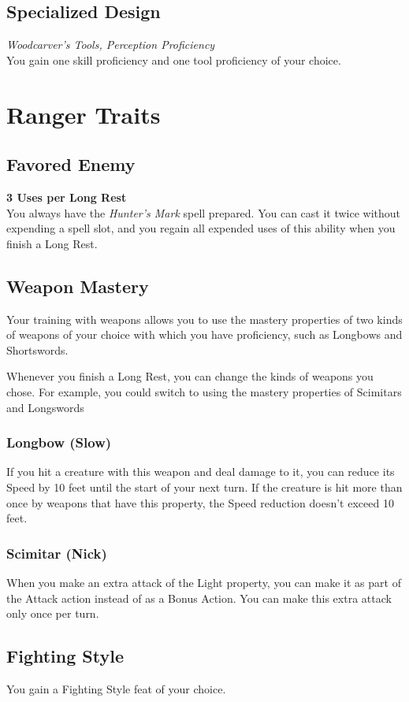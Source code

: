 \documentclass[letterpaper,openany,oneside,twocolumn]{book}
\begin{document}
\subsection*{Specialized Design}
\textit{Woodcarver's Tools, Perception Proficiency}\\
You gain one skill proficiency and one tool proficiency of your choice.

\section*{Ranger Traits}
\subsection*{Favored Enemy}
\textbf{3 Uses per Long Rest}\\
You always have the \textit{Hunter's Mark} spell prepared. You can cast it twice without expending a spell slot, and you regain all expended uses of this ability when you finish a Long Rest.
\subsection*{Weapon Mastery}
Your training with weapons allows you to use the mastery properties of two kinds of weapons of your choice with which you have proficiency, such as Longbows and Shortswords.

Whenever you finish a Long Rest, you can change the kinds of weapons you chose. For example, you could switch to using the mastery properties of Scimitars and Longswords
\subsubsection*{Longbow (Slow)}
If you hit a creature with this weapon and deal damage to it, you can reduce its Speed by 10 feet until the start of your next turn. If the creature is hit more than once by weapons that have this property, the Speed reduction doesn't exceed 10 feet.
\subsubsection*{Scimitar (Nick)}
When you make an extra attack of the Light property, you can make it as part of the Attack action instead of as a Bonus Action. You can make this extra attack only once per turn.
\subsection*{Fighting Style}
You gain a Fighting Style feat of your choice.
\end{document}

